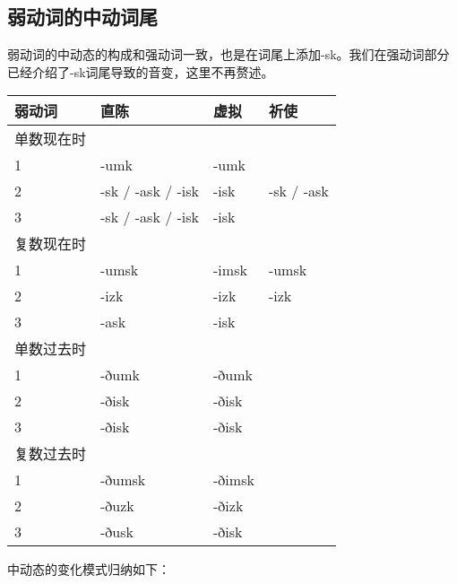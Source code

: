 \subsection{弱动词的中动词尾}\label{弱动词的中动词尾}

弱动词的中动态的构成和强动词一致，也是在词尾上添加-sk。我们在强动词部分已经介绍了-sk词尾导致的音变，这里不再赘述。

\begin{longtable}{llll}
    \toprule
    弱动词   & 直陈                & 虚拟     & 祈使         \\
    \midrule
    \endhead
    \bottomrule
    \endfoot
    单数现在时 &                   &        &            \\
    1     & -umk              & -umk   &            \\
    2     & -sk / -ask / -isk & -isk   & -sk / -ask \\
    3     & -sk / -ask / -isk & -isk   &            \\
    复数现在时 &                   &        &            \\
    1     & -umsk             & -imsk  & -umsk      \\
    2     & -izk              & -izk   & -izk       \\
    3     & -ask              & -isk   &            \\
    单数过去时 &                   &        &            \\
    1     & -ðumk             & -ðumk  &            \\
    2     & -ðisk             & -ðisk  &            \\
    3     & -ðisk             & -ðisk  &            \\
    复数过去时 &                   &        &            \\
    1     & -ðumsk            & -ðimsk &            \\
    2     & -ðuzk             & -ðizk  &            \\
    3     & -ðusk             & -ðisk  &            \\
\end{longtable}

中动态的变化模式归纳如下：

